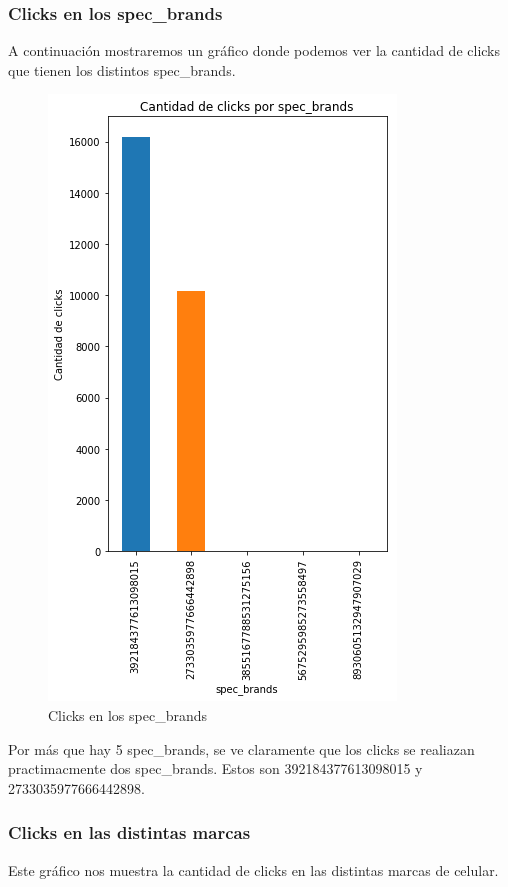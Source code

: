 \documentclass[a4paper, 12pt]{article}
\begin{document}
	\subsubsection{Clicks en los spec\_brands}
		 A continuación mostraremos un gráfico donde podemos ver la cantidad de clicks que tienen los distintos spec\_brands.

		\FloatBarrier
		\begin{figure}[h]
			\centering
			\includegraphics[scale = 0.7]{images/clicks/clicks_specs_brand.png}
			\caption{Clicks en los spec\_brands}
		\end{figure}
		\FloatBarrier

		 Por más que hay 5 spec\_brands, se ve claramente que los clicks se realiazan practimacmente dos spec\_brands.
		Estos son 392184377613098015 y 2733035977666442898.
		

	\subsubsection{Clicks en las distintas marcas}
		 Este gráfico nos muestra la cantidad de clicks en las distintas marcas de celular.
\end{document}
